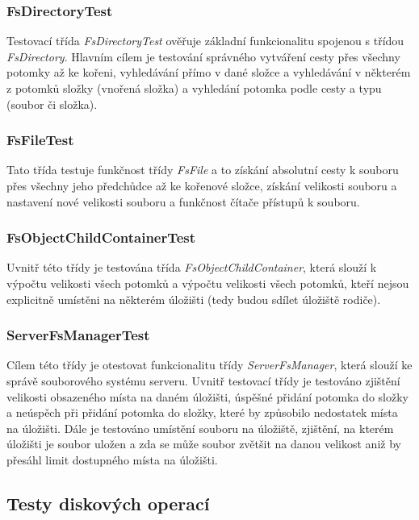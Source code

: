 \documentclass[czech,DP]{thesiskiv}
\begin{document}
\subsubsection*{FsDirectoryTest}

Testovací třída \textit{FsDirectoryTest} ověřuje základní funkcionalitu spojenou s třídou \textit{FsDirectory}. Hlavním cílem je testování správného vytváření cesty přes všechny potomky až ke kořeni, vyhledávání přímo v dané složce a vyhledávání v některém z potomků složky (vnořená složka) a vyhledání potomka podle cesty a typu (soubor či složka).

\subsubsection*{FsFileTest}

Tato třída testuje funkčnost třídy \textit{FsFile} a to získání absolutní cesty k souboru přes všechny jeho předchůdce až ke kořenové složce, získání velikosti souboru a nastavení nové velikosti souboru a funkčnost čítače přístupů k souboru.

\subsubsection*{FsObjectChildContainerTest}

Uvnitř této třídy je testována třída \textit{FsObjectChildContainer}, která slouží k výpočtu velikosti všech potomků a výpočtu velikosti všech potomků, kteří nejsou explicitně umístěni na některém úložišti (tedy budou sdílet úložiště rodiče).

\subsubsection*{ServerFsManagerTest}

Cílem této třídy je otestovat funkcionalitu třídy \textit{ServerFsManager}, která slouží ke správě souborového systému serveru. Uvnitř testovací třídy je testováno zjištění velikosti obsazeného místa na daném úložišti, úspěšné přidání potomka do složky a neúspěch při přidání potomka do složky, které by způsobilo nedostatek místa na úložišti. Dále je testováno umístění souboru na úložiště, zjištění, na kterém úložišti je soubor uložen a zda se může soubor zvětšit na danou velikost aniž by přesáhl limit dostupného místa na úložišti.

\subsection{Testy diskových operací}
\end{document}
